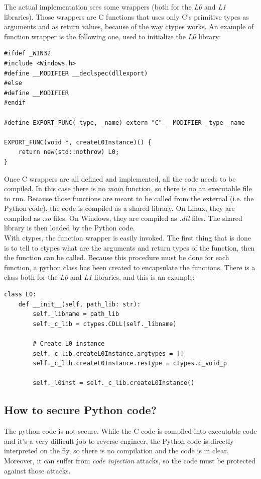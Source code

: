The actual implementation sees some wrappers (both for the \textit{L0} and \textit{L1} libraries). Those wrappers are C functions that uses only C's primitive types as arguments and as return values, because of the way ctypes works. An example of function wrapper is the following one, used to initialize the \textit{L0} library:

\begin{lstlisting}[style=CStyle]
#ifdef _WIN32
#include <Windows.h>
#define __MODIFIER __declspec(dllexport)
#else
#define __MODIFIER 
#endif

#define EXPORT_FUNC(_type, _name) extern "C" __MODIFIER _type _name

EXPORT_FUNC(void *, createL0Instance)() {
    return new(std::nothrow) L0;
}

\end{lstlisting}

Once C wrappers are all defined and implemented, all the code needs to be compiled. In this case there is no \textit{main} function, so there is no an executable file to run. Because those functions are meant to be called from the external (i.e. the Python code), the code is compiled as a shared library. On Linux, they are compiled as \textit{.so} files. On Windows, they are compiled as \textit{.dll} files. The shared library is then loaded by the Python code.\\

With ctypes, the function wrapper is easily invoked. The first thing that is done is to tell to ctypes what are the arguments and return types of the function, then the function can be called. Because this procedure must be done for each function, a python class has been created to encapsulate the functions. There is a class both for the \textit{L0} and \textit{L1} libraries, and this is an example:

\begin{lstlisting}[style=PyStyle]
class L0:
    def __init__(self, path_lib: str):
        self._libname = path_lib
        self._c_lib = ctypes.CDLL(self._libname)

        # Create L0 instance
        self._c_lib.createL0Instance.argtypes = []
        self._c_lib.createL0Instance.restype = ctypes.c_void_p

        self._l0inst = self._c_lib.createL0Instance()
\end{lstlisting}

\subsection{How to secure Python code?}
The python code is not secure. While the C code is compiled into executable code and it's a very difficult job to reverse engineer, the Python code is directly interpreted on the fly, so there is no compilation and the code is in clear. Moreover, it can suffer from \textit{code injection} attacks, so the code must be protected against those attacks.\\

